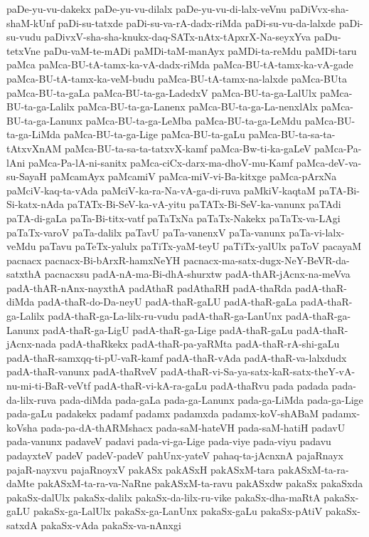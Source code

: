 {paDe-yu-vu-dakekx
paDe-yu-vu-dilalx
paDe-yu-vu-di-lalx-veVnu
paDiVvx-sha-shaM-kUnf
paDi-su-tatxde
paDi-su-va-rA-dadx-riMda
paDi-su-vu-da-lalxde
paDi-su-vudu
paDivxV-sha-sha-knukx-daq-SATx-nAtx-tApxrX-Na-seyxYva
paDu-tetxVne
paDu-vaM-te-mADi
paMDi-taM-manAyx
paMDi-ta-reMdu
paMDi-taru
paMca
paMca-BU-tA-tamx-ka-vA-dadx-riMda
paMca-BU-tA-tamx-ka-vA-gade
paMca-BU-tA-tamx-ka-veM-budu
paMca-BU-tA-tamx-na-lalxde
paMca-BUta
paMca-BU-ta-gaLa
paMca-BU-ta-ga-LadedxV
paMca-BU-ta-ga-LalUlx
paMca-BU-ta-ga-Lalilx
paMca-BU-ta-ga-Lanenx
paMca-BU-ta-ga-La-nenxlAlx
paMca-BU-ta-ga-Lanunx
paMca-BU-ta-ga-LeMba
paMca-BU-ta-ga-LeMdu
paMca-BU-ta-ga-LiMda
paMca-BU-ta-ga-Lige
paMca-BU-ta-gaLu
paMca-BU-ta-sa-ta-tAtxvXnAM
paMca-BU-ta-sa-ta-tatxvX-kamf
paMca-Bw-ti-ka-gaLeV
paMca-Pa-lAni
paMca-Pa-lA-ni-sanitx
paMca-ciCx-darx-ma-dhoV-mu-Kamf
paMca-deV-va-su-SayaH
paMcamAyx
paMcamiV
paMca-miV-vi-Ba-kitxge
paMca-pArxNa
paMciV-kaq-ta-vAda
paMciV-ka-ra-Na-vA-ga-di-ruva
paMkiV-kaqtaM
paTA-Bi-Si-katx-nAda
paTATx-Bi-SeV-ka-vA-yitu
paTATx-Bi-SeV-ka-vanunx
paTAdi
paTA-di-gaLa
paTa-Bi-titx-vatf
paTaTxNa
paTaTx-Nakekx
paTaTx-va-LAgi
paTaTx-varoV
paTa-dalilx
paTavU
paTa-vanenxV
paTa-vanunx
paTa-vi-lalx-veMdu
paTavu
paTeTx-yalulx
paTiTx-yaM-teyU
paTiTx-yalUlx
paToV
pacayaM
pacnacx
pacnacx-Bi-bArxR-hamxNeYH
pacnacx-ma-satx-dugx-NeY-BeVR-da-satxthA
pacnacxsu
padA-nA-ma-Bi-dhA-shurxtw
padA-thAR-jAcnx-na-meVva
padA-thAR-nAnx-nayxthA
padAthaR
padAthaRH
padA-thaRda
padA-thaR-diMda
padA-thaR-do-Da-neyU
padA-thaR-gaLU
padA-thaR-gaLa
padA-thaR-ga-Lalilx
padA-thaR-ga-La-lilx-ru-vudu
padA-thaR-ga-LanUnx
padA-thaR-ga-Lanunx
padA-thaR-ga-LigU
padA-thaR-ga-Lige
padA-thaR-gaLu
padA-thaR-jAcnx-nada
padA-thaRkekx
padA-thaR-pa-yaRMta
padA-thaR-rA-shi-gaLu
padA-thaR-samxqq-ti-pU-vaR-kamf
padA-thaR-vAda
padA-thaR-va-lalxdudx
padA-thaR-vanunx
padA-thaRveV
padA-thaR-vi-Sa-ya-satx-kaR-satx-theY-vA-nu-mi-ti-BaR-veVtf
padA-thaR-vi-kA-ra-gaLu
padA-thaRvu
pada
padada
pada-da-lilx-ruva
pada-diMda
pada-gaLa
pada-ga-Lanunx
pada-ga-LiMda
pada-ga-Lige
pada-gaLu
padakekx
padamf
padamx
padamxda
padamx-koV-shABaM
padamx-koVsha
pada-pa-dA-thARMshacx
pada-saM-hateVH
pada-saM-hatiH
padavU
pada-vanunx
padaveV
padavi
pada-vi-ga-Lige
pada-viye
pada-viyu
padavu
padayxteV
padeV
padeV-padeV
pahUnx-yateV
pahaq-ta-jAcnxnA
pajaRnayx
pajaR-nayxvu
pajaRnoyxV
pakASx
pakASxH
pakASxM-tara
pakASxM-ta-ra-daMte
pakASxM-ta-ra-va-NaRne
pakASxM-ta-ravu
pakASxdw
pakaSx
pakaSxda
pakaSx-dalUlx
pakaSx-dalilx
pakaSx-da-lilx-ru-vike
pakaSx-dha-maRtA
pakaSx-gaLU
pakaSx-ga-LalUlx
pakaSx-ga-LanUnx
pakaSx-gaLu
pakaSx-pAtiV
pakaSx-satxdA
pakaSx-vAda
pakaSx-va-nAnxgi
}

